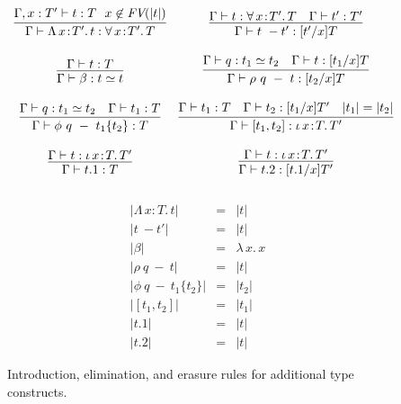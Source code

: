 \documentclass[acmsmall,screen]{acmart}
\newcommand{\labfig}[1]{\label{fig:#1}}
\newcommand{\abs}[4]{{#1}\, #2\! : \! #3.\, #4}
\newcommand{\lam}[2]{\lambda\, #1.\, #2}
\begin{document}
\begin{figure}
\centering
{}  
  \[
  \begin{array}{cc}
    \infer{\Gamma\vdash \abs{\Lambda}{x}{T'}{t} : \abs{\forall}{x}{T'}{T}}{\Gamma,x:T'\vdash t : T & \!\!x\not\in\textit{FV}(|t|)} & 
    \infer{\Gamma\vdash t\ -t' : [t'/x]T}{\Gamma\vdash t : \abs{\forall}{x}{T'}{T} & \Gamma\vdash t':T'} \\ \\

    \infer{\Gamma\vdash \beta : t \simeq t}{\Gamma\vdash t : T} &
    \infer{\Gamma\vdash \rho\ q\ -\ t : [t_2/x]T}{\Gamma\vdash q : t_1 \simeq t_2 & \Gamma \vdash t : [t_1/x]T} \\ \\

    \infer{\Gamma\vdash \phi\ q\ -\ t_1 \{t_2\} : T}{\Gamma\vdash q : t_1 \simeq t_2 & \Gamma \vdash t_1 : T} &
    \infer{\Gamma\vdash [t_1,t_2] : \abs{\iota}{x}{T}{T'}}{\Gamma\vdash t_1 : T & \Gamma\vdash t_2 : [t_1/x]T' & |t_1| = |t_2|} \\ \\

    \infer{\Gamma\vdash t.1 : T}{\Gamma\vdash t : \abs{\iota}{x}{T}{T'}} &
    \infer{\Gamma\vdash t.2 : [t.1/x]T'}{\Gamma\vdash t : \abs{\iota}{x}{T}{T'}} \\ \\

  \end{array}
  \]
\endminipage\hfill 
{}
\[
  \begin{array}{lll}
    |\abs{\Lambda}{x}{T}{t}| & = & |t| \\
    |t\ -t'| & = & |t| \\
    |\beta| & = & \lam{x}{x} \\
    |\rho\ q\ - \ t| & = & |t| \\
    |\phi\ q\ - \ t_1 \{t_2\}| & = & |t_2| \\
    |[t_1,t_2]| & = & |t_1| \\
    |t.1| & = & |t| \\
    |t.2| & = & |t| 
  \end{array}
  \]
\endminipage
\caption{Introduction, elimination, and erasure rules for additional type constructs.}
\labfig{cdle}
\end{figure}
\end{document}
